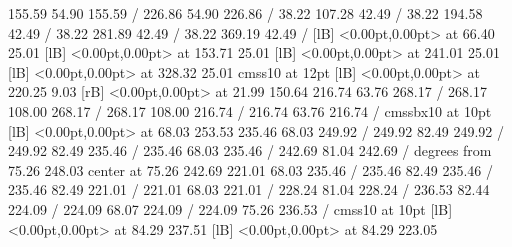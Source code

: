 { 155.59 54.90 155.59 /
\setsolid
{} 226.86 54.90 226.86 /
\setsolid
{} 38.22 107.28 42.49 /
\setsolid
{} 38.22 194.58 42.49 /
\setsolid
{} 38.22 281.89 42.49 /
\setsolid
{} 38.22 369.19 42.49 /
  [lB] <0.00pt,0.00pt> at 66.40 25.01
  [lB] <0.00pt,0.00pt> at 153.71 25.01
  [lB] <0.00pt,0.00pt> at 241.01 25.01
  [lB] <0.00pt,0.00pt> at 328.32 25.01
\font\picfont cmss10 at 12pt\picfont
{}  [lB] <0.00pt,0.00pt> at 220.25 9.03
 [rB] <0.00pt,0.00pt> at 21.99 150.64
\setsolid
{} 216.74 63.76 268.17 /
 268.17 108.00 268.17 /
 268.17 108.00 216.74 /
 216.74 63.76 216.74 /
\font\picfont cmssbx10 at 10pt\picfont
{}  [lB] <0.00pt,0.00pt> at 68.03 253.53
\setsolid
{} 235.46 68.03 249.92 /
 249.92 82.49 249.92 /
 249.92 82.49 235.46 /
 235.46 68.03 235.46 /
\setsolid
{} 242.69 81.04 242.69 /
 degrees from 75.26 248.03 center at 75.26 242.69
\setsolid
{} 221.01 68.03 235.46 /
 235.46 82.49 235.46 /
 235.46 82.49 221.01 /
 221.01 68.03 221.01 /
\setsolid
{} 228.24 81.04 228.24 /
\setsolid
{} 236.53 82.44 224.09 /
 224.09 68.07 224.09 /
 224.09 75.26 236.53 /
\font\picfont cmss10 at 10pt\picfont
{}  [lB] <0.00pt,0.00pt> at 84.29 237.51
  [lB] <0.00pt,0.00pt> at 84.29 223.05
\endpicture
}
